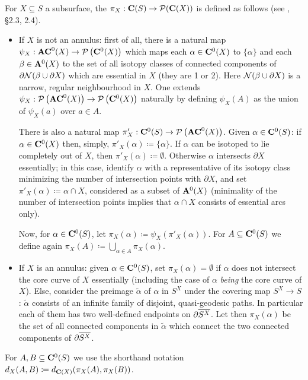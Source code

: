 \begin{defin}\label{def:subsurfaceproj}
For $X\subseteq S$ a subsurface, the  $\pi_X:\mathbf C(S)\rightarrow \mathcal P(\mathbf C(X))$ is defined as follows (see \cite{masurminskyii}, \S 2.3, 2.4). 

\begin{itemize}
\item If $X$ is not an annulus: first of all, there is a natural map $\psi_X:\mathbf{AC}^0(X)\rightarrow \mathcal{P}\left(\mathbf C^0(X)\right)$ which maps each $\alpha\in\mathbf C^0(X)$ to $\{\alpha\}$ and each $\beta\in\mathbf A^0(X)$ to the set of all isotopy classes of connected components of $\partial{\mathcal N}(\beta\cup \partial X)$ which are essential in $X$ (they are 1 or 2). Here ${\mathcal N}(\beta\cup \partial X)$ is a narrow, regular neighbourhood in $X$. One extends $\psi_X:\mathcal{P}\left(\mathbf{AC}^0(X)\right)\rightarrow \mathcal{P}\left(\mathbf C^0(X)\right)$ naturally by defining $\psi_X(A)$ as the union of $\psi_X(a)$ over $a\in A$.

There is also a natural map $\pi'_X:\mathbf C^0(S)\rightarrow \mathcal P\left(\mathbf{AC}^0(X)\right)$. Given $\alpha\in \mathbf C^0(S)$: if $\alpha\in\mathbf C^0(X)$ then, simply, $\pi'_X(\alpha)\coloneqq \{\alpha\}$. If $\alpha$ can be isotoped to lie completely out of $X$, then $\pi'_X(\alpha)\coloneqq\emptyset$. Otherwise $\alpha$ intersects $\partial X$ essentially; in this case, identify $\alpha$ with a representative of its isotopy class minimizing the number of intersection points with $\partial X$, and set $\pi'_X(\alpha)\coloneqq\alpha\cap X$, considered as a subset of $\mathbf A^0(X)$ (minimality of the number of intersection points implies that $\alpha\cap X$ consists of essential arcs only).

Now, for $\alpha\in\mathbf C^0(S)$, let $\pi_X(\alpha)\coloneqq \psi_X\left(\pi'_X(\alpha)\right)$. For $A\subseteq\mathbf C^0(S)$ we define again $\pi_X(A)\coloneqq\bigcup_{\alpha\in A} \pi_X(\alpha)$.

\item If $X$ is an annulus: given $\alpha\in \mathbf C^0(S)$, set $\pi_X(\alpha)=\emptyset$ if $\alpha$ does not intersect the core curve of $X$ essentially (including the case of $\alpha$ \emph{being} the core curve of $X$). Else, consider the preimage $\tilde\alpha$ of $\alpha$ in $S^X$ under the covering map $S^X\rightarrow S$: $\tilde\alpha$ consists of an infinite family of disjoint, quasi-geodesic paths. In particular each of them has two well-defined endpoints on $\partial\overline{S^X}$. Let then $\pi_X(\alpha)$ be the set of all connected components in $\tilde\alpha$ which connect the two connected components of $\partial\overline{S^X}$.
\end{itemize}

For $A,B\subseteq \mathbf C^0(S)$ we use the shorthand notation $d_X(A,B)\coloneqq d_{\mathbf C(X)}(\pi_X(A),\pi_X(B))$.
\end{defin}


